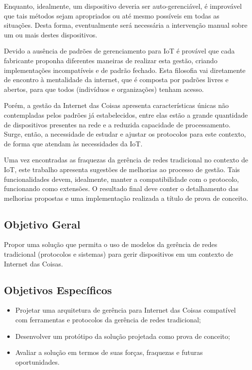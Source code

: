 \documentclass[twoside,english,brazilian]{UNISINOSmonografia}
\begin{document}
	Enquanto, idealmente, um 
	dispositivo deveria ser auto-gerenciável, é improvável que tais métodos 
	sejam apropriados ou até mesmo possíveis em todas as situações. Desta 
	forma, eventualmente será 
	necessária a intervenção manual sobre um ou mais destes dispositivos.

	Devido a ausência de padrões de gerenciamento para IoT é provável que cada 
	fabricante 
	proponha diferentes maneiras de realizar esta gestão, criando 
	implementações 
	incompatíveis e de padrão fechado. Esta filosofia vai diretamente 
	de encontro à mentalidade da internet, que é composta por padrões livres e 
	abertos,
	para que todos (indivíduos e organizações) tenham acesso.

	Porém, a gestão da Internet das Coisas apresenta características únicas 
	não contempladas pelos padrões já estabelecidos, entre elas estão a grande 
	quantidade de dispositivos presentes na rede e a reduzida capacidade de 
	processamento. Surge, então, a necessidade de estudar e ajustar os 
	protocolos para este contexto, de forma que atendam às necessidades da IoT.

	Uma vez encontradas as fraquezas da gerência de redes tradicional no 
	contexto de IoT, este trabalho apresenta sugestões de melhorias ao 
	processo de gestão.
	Tais funcionalidades devem, idealmente, manter a compatibilidade com o 
	protocolo, funcionando como extensões. 
	O resultado final deve conter o detalhamento das melhorias propostas e uma 
	implementação realizada a título de prova de conceito.

\subsection{Objetivo Geral}

Propor uma solução que permita o uso de modelos da gerência de 
redes tradicional (protocolos e sistemas) para gerir dispositivos em um 
contexto de Internet das Coisas.

\subsection{Objetivos Específicos}
	\begin{itemize}
		\item
		Projetar uma arquitetura de gerência para Internet das Coisas 
		compatível com ferramentas e protocolos da gerência de redes 
		tradicional;
		
		\item
		Desenvolver um protótipo da solução projetada como prova de conceito;

		\item
		Avaliar a solução em termos de suas forças, fraquezas e futuras 
		oportunidades.
		
	\end{itemize}
\end{document}
